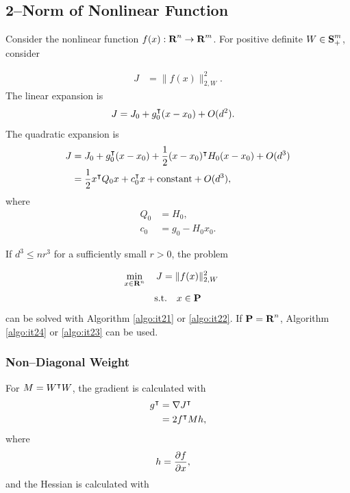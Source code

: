 \documentclass{article}
\begin{document}
\clearpage

\subsection{2--Norm of Nonlinear Function}

    Consider the nonlinear function $f(x):\textbf{R}^n\to\textbf{R}^m$. For positive definite $W\in\textbf{S}_+^m$, consider

    \begin{align*}
        J &= \|f(x)\|_{2,W}^2.
    \end{align*}
    The linear expansion is
    \begin{align*}
        J &= J_0 + g_0^\intercal(x-x_0) + O(d^2).
    \end{align*}
    The quadratic expansion is
    \begin{align*}
        J &= J_0 + g_0^\intercal(x-x_0)+\frac{1}{2} (x-x_0)^\intercal H_0 (x-x_0)+ O(d^3)\\
        &=\frac{1}{2} x^\intercal Q_0 x+c_0^\intercal x+\text{constant}+ O(d^3),
    \end{align*}
    where
    \begin{align*}
        Q_0&=H_0,\\
        c_0&=g_0-H_0x_0.
    \end{align*}

    If $d^3\leq nr^3$ for a sufficiently small $r>0$, the problem

    \begin{align*}
        \min_{x\in\textbf{R}^n}\quad J &= \|f(x)\|_{2,W}^2\
    \end{align*}
    \begin{align*}
        \text{s.t.} \quad x\in\textbf{P}
    \end{align*}
    can be solved with Algorithm \ref{algo:it21} or \ref{algo:it22}.
    If $\textbf{P}=\textbf{R}^n$, Algorithm \ref{algo:it24} or \ref{algo:it23} can be used.
    \\

    \subsubsection{Non--Diagonal Weight}
    For $M=W^\intercal W$, the gradient is calculated with
    \begin{align*}
        g^\intercal & = \nabla J^\intercal\\
            & = 2f^\intercal M h,
    \end{align*}
    where
    \begin{align*}
        h &= \frac{\partial f}{\partial x},
    \end{align*}
    and the Hessian is calculated with
\end{document}
